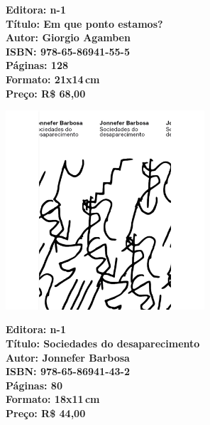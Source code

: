 \vfill

\hspace*{-.4cm}\begin{minipage}[c]{1\linewidth}
\small\textbf{
\hspace*{-.1cm}Editora: n-1\\
Título: Em que ponto estamos?\\
Autor: Giorgio Agamben\\
ISBN: 978-65-86941-55-5\\
Páginas: 128\\
Formato: 21x14\,cm\\
Preço: R\$ 68,00\\
}
\end{minipage}

\pagebreak


\begin{center}
\hspace*{.5cm}\includegraphics[width=74mm]{./CAPAS/barbosa.jpg}
\end{center}

\hspace*{-7cm}\hrulefill\hspace*{-7cm}

\medskip

\noindent{}

\vfill

\hspace*{-.4cm}\begin{minipage}[c]{1\linewidth}
\small\textbf{
\hspace*{-.1cm}Editora: n-1\\
Título: Sociedades do desaparecimento\\
Autor: Jonnefer Barbosa\\
ISBN: 978-65-86941-43-2\\
Páginas: 80\\
Formato: 18x11\,cm\\
Preço: R\$ 44,00\\
}
\end{minipage}

